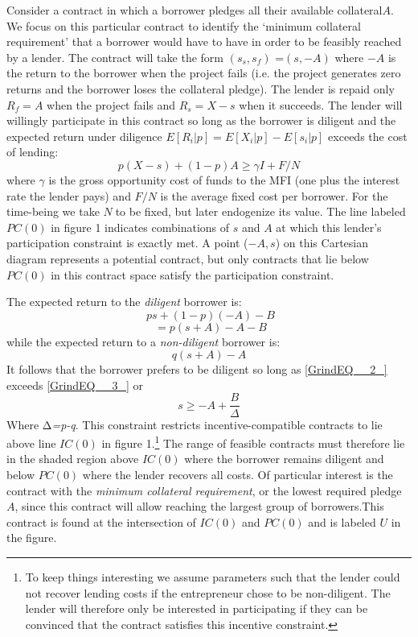 \documentclass{article} %
\begin{document}
Consider a contract in which a borrower pledges all their available collateral$A$. We focus on this particular contract to identify the `minimum collateral requirement' that a borrower would have to have in order to be feasibly reached by a lender. The contract will take the form $(s_{s} ,s_{f} )$ =$(s,-A)$ where $-A$ is the return to the borrower when the project fails (i.e. the project generates zero returns and the borrower loses the collateral pledge). The lender is repaid only $R_{f} =A$ when the project fails and $R_{s} =X-s$ when it succeeds.   The lender will willingly participate in this contract so long as the borrower is diligent and the expected return under diligence $E[R_{i} |p]=E[X_{i} |p]-E[s_{i} |p]$ exceeds the cost of lending:
\begin{equation} \label{1)} 
p(X-s)+(1-p)A\ge \gamma I+F/N 
\end{equation} 
where $\gamma $ is the gross opportunity cost of funds to the MFI (one plus the interest rate the lender pays) and $F/N$ is the average fixed cost per borrower.  For the time-being we take $N\; $to be fixed, but later endogenize its value.  The line labeled $PC(0)$ in figure 1 indicates combinations of $s$ and $A$ at which this lender's participation constraint is exactly met.  A point ($-A,s$) on this Cartesian diagram represents a potential contract, but only contracts that lie below $PC(0)$ in this contract space satisfy the participation constraint. 

The expected return to the \textit{diligent} borrower is:
\[\phantom{.} ps+(1-p)(-A)-B\] 
\begin{equation} \label{2)} 
\phantom{.} =p(s+A)-A-B 
\end{equation} 
while the expected return to a \textit{non-diligent} borrower is:
\begin{equation} \label{3)} 
q(s+A)-A 
\end{equation} 
It follows that the borrower prefers to be diligent so long as \eqref{GrindEQ__2_} exceeds \eqref{GrindEQ__3_} or
\begin{equation} \label{ZEqnNum603329} 
s\ge -A+\frac{B}{\Delta }  
\end{equation} 
Where $\mathrm{\Delta }$\textit{=p-q}. This constraint restricts incentive-compatible contracts to lie above line $IC(0)$ in figure 1.\footnote{  To keep things interesting we assume parameters such that the lender could not recover lending costs if the entrepreneur chose to be non-diligent.  The lender will therefore only be interested in participating if they can be convinced that the contract satisfies this incentive constraint. }  The range of feasible contracts must therefore lie in the shaded region above $IC(0)$ where the borrower remains diligent and below $PC(0)$ where the lender recovers all costs.  Of particular interest is the contract with the \textit{minimum collateral requirement}, or the lowest required pledge $A$, since this contract will allow reaching the largest group of borrowers$.$This contract is found at the intersection of $IC(0)$ and $PC(0)$ and is labeled $U$ in the figure. 
\end{document}

